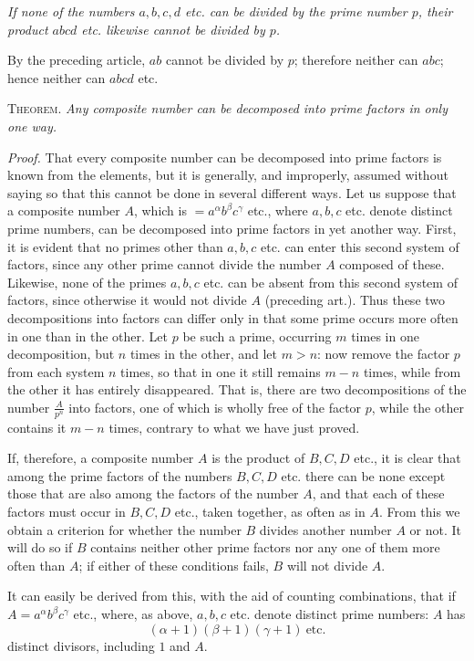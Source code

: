 \emph{If none of the numbers $a, b, c, d$ etc. can be divided by the prime number $p$, their product $abcd$ etc. likewise cannot be divided by $p$.}

By the preceding article, $ab$ cannot be divided by $p$; therefore neither can $abc$; hence neither can $abcd$ etc.

\textsc{Theorem}. \emph{Any composite number can be decomposed into prime factors in only one way.}

\emph{Proof.} That every composite number can be decomposed into prime factors is known from the elements, but it is generally, and improperly, assumed without saying so that this cannot be done in several different ways. Let us suppose that a composite number $A$, which is $=a^\alpha b^\beta c^\gamma$ etc., where $a, b, c$ etc. denote distinct prime numbers, can be decomposed into prime factors in yet another way. First, it is evident that no primes other than $a, b, c$ etc. can enter this second system of factors, since any other prime cannot divide the number $A$ composed of these. Likewise, none of the primes $a, b, c$ etc. can be absent from this second system of factors, since otherwise it would not divide $A$ (preceding art.). Thus these two decompositions into factors can differ only in that some prime occurs more often in one than in the other. Let $p$ be such a prime, occurring $m$ times in one decomposition, but $n$ times in the other, and let $m>n$: now remove the factor $p$ from each system $n$ times, so that in one it still remains $m-n$ times, while from the other it has entirely disappeared. That is, there are two decompositions of the number $\frac{A}{p^n}$ into factors, one of which is wholly free of the factor $p$, while the other contains it $m-n$ times, contrary to what we have just proved.

If, therefore, a composite number $A$ is the product of $B, C, D$ etc., it is clear that among the prime factors of the numbers $B, C, D$ etc. there can be none except those that are also among the factors of the number $A$, and that each of these factors must occur in $B, C, D$ etc., taken together, as often as in $A$. From this we obtain a criterion for whether the number $B$ divides another number $A$ or not. It will do so if $B$ contains neither other prime factors nor any one of them more often than $A$; if either of these conditions fails, $B$ will not divide $A$.

It can easily be derived from this, with the aid of counting combinations, that if $A=a^\alpha b^\beta c^\gamma$ etc., where, as above, $a, b, c$ etc. denote distinct prime numbers: $A$ has
\[
(\alpha+1)(\beta+1)(\gamma+1)\ \mathrm{etc.}
\]
distinct divisors, including $1$ and $A$.

